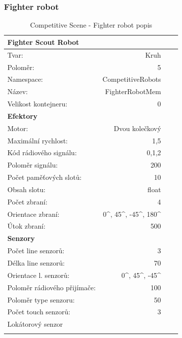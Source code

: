 \subsubsection{Fighter robot}
\par  
\begin{table}[h]\centering
	\begin{tabular}{l@{\hspace{1.0cm}}D{.}{,}{2.2}D{.}{,}{2.2}D{.}{,}{2.3}}
		\toprule
		\textbf{Fighter Scout Robot} \\
		\midrule
		Tvar: & Kruh\\
		Poloměr: & 5\\
		Namespace: & CompetitiveRobots\\
		Název: & FighterRobotMem \\
		Velikost kontejneru: & 0\\
		\midrule
		\textbf{Efektory} \\
		\midrule
		Motor: & Dvou kolečkový \\
		Maximální rychlost: & 1,5 \\
		Kód rádiového signálu: & 0,1,2\\
		Poloměr signálu: & 200\\
		Počet paměťových slotů: &10 \\
		Obsah slotu: & float\\
		Počet zbraní: & 4\\
		Orientace zbraní: &  0^\circ, 45^\circ, -45^\circ, 180^\circ\\
		Útok zbraní: & 500\\
		\midrule
		\textbf{Senzory} \\
		\midrule
		Počet line senzorů: &  3\\
		Délka line senzorů: & 70\\
		Orientace l. senzorů: & 0^\circ, 45^\circ, -45^\circ\\
		Poloměr rádiového přijímače: & 100 \\
		Poloměr type senzoru: & 50\\
		Počet touch senzorů: & 3 \\  
		Lokátorový senzor\\ 
		\bottomrule
	\end{tabular}
	\caption{Competitive Scene - Fighter robot popis }
	\label{tab04:CompetitiveScene}
\end{table}
\clearpage
